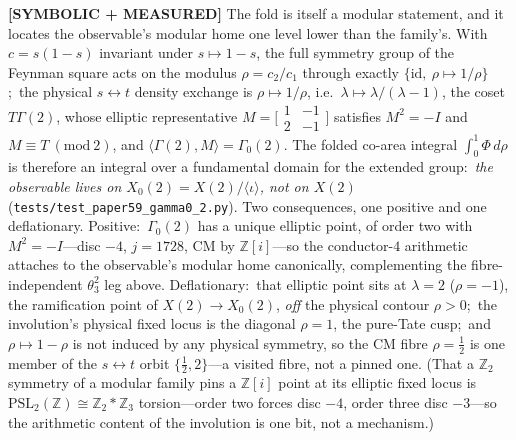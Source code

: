 \documentclass[aps,pra,twocolumn,superscriptaddress,longbibliography]{revtex4-2}
\begin{document}
\textbf{[SYMBOLIC + MEASURED]} The fold is itself a modular statement, and it locates the
observable's modular home one level lower than the family's.  With $c=s(1-s)$ invariant under
$s\mapsto1-s$, the full symmetry group of the Feynman square acts on the modulus
$\rho=c_{2}/c_{1}$ through exactly $\{\mathrm{id},\ \rho\mapsto1/\rho\}$;\ the physical
$s\leftrightarrow t$ density exchange is $\rho\mapsto1/\rho$, i.e.\
$\lambda\mapsto\lambda/(\lambda-1)$, the coset $T\Gamma(2)$, whose elliptic representative
$M=\bigl[\begin{smallmatrix}1&-1\\2&-1\end{smallmatrix}\bigr]$ satisfies $M^{2}=-I$ and
$M\equiv T\ (\mathrm{mod}\ 2)$, and $\langle\Gamma(2),M\rangle=\Gamma_{0}(2)$.  The folded
co-area integral $\int_{0}^{1}\Phi\,d\rho$ is therefore an integral over a fundamental domain
for the extended group:\ \emph{the observable lives on $X_{0}(2)=X(2)/\langle\iota\rangle$, not
on $X(2)$} (\texttt{tests/test\_paper59\_gamma0\_2.py}).  Two consequences, one positive and
one deflationary.  Positive:\ $\Gamma_{0}(2)$ has a unique elliptic point, of order two with
$M^{2}=-I$---disc $-4$, $j=1728$, CM by $\mathbb{Z}[i]$---so the conductor-$4$ arithmetic attaches to
the observable's modular home canonically, complementing the fibre-independent
$\theta_{3}^{2}$ leg above.  Deflationary:\ that elliptic point sits at $\lambda=2$
($\rho=-1$), the ramification point of $X(2)\to X_{0}(2)$, \emph{off} the physical contour
$\rho>0$;\ the involution's physical fixed locus is the diagonal $\rho=1$, the pure-Tate cusp;\
and $\rho\mapsto1-\rho$ is not induced by any physical symmetry, so the CM fibre
$\rho=\tfrac12$ is one member of the $s\leftrightarrow t$ orbit $\{\tfrac12,2\}$---a visited
fibre, not a pinned one.  (That a $\mathbb{Z}_{2}$ symmetry of a modular family pins a $\mathbb{Z}[i]$ point at
its elliptic fixed locus is $\mathrm{PSL}_{2}(\mathbb{Z})\cong\mathbb{Z}_{2}\ast\mathbb{Z}_{3}$ torsion---order two
forces disc $-4$, order three disc $-3$---so the arithmetic content of the involution is one
bit, not a mechanism.)
\end{document}

